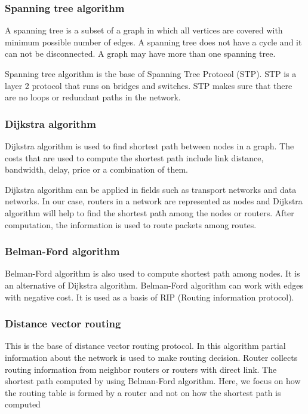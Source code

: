  \subsubsection{Spanning tree algorithm}
 
 A spanning tree is a subset of a graph in which all vertices  are covered with minimum possible number of edges. A spanning tree does not have a cycle and it can not be disconnected. A graph may have more than one spanning tree. 
 
Spanning tree algorithm is the base of Spanning Tree Protocol (STP). STP is a layer 2 protocol that runs on bridges and switches. STP makes sure that there are no loops or redundant paths in the network.

\subsubsection{Dijkstra algorithm}

Dijkstra algorithm is used to find shortest path between nodes in a graph. The costs that are used to compute the shortest path include link distance, bandwidth, delay, price or a combination of them. 

Dijkstra algorithm can be applied in fields such as transport networks and data networks. In our case, routers in a network are represented as nodes and Dijkstra algorithm will help to find the shortest path among the nodes or routers. After computation, the information is used to route packets among routes.   
 
 \subsubsection{Belman-Ford algorithm}
  
  Belman-Ford algorithm is also used to compute shortest path among nodes. It is an alternative of Dijkstra algorithm. Belman-Ford algorithm can work with edges with negative cost. It is used as a basis of RIP (Routing information protocol).
  
  \subsubsection{Distance vector routing}
  
 This is the base of distance vector routing protocol. In this algorithm partial information about the network is used to make routing decision. Router collects routing information from neighbor routers or routers with direct link. The shortest path computed by using Belman-Ford algorithm. Here, we focus on how the routing table is formed by a router and not on how the shortest path is computed
 
